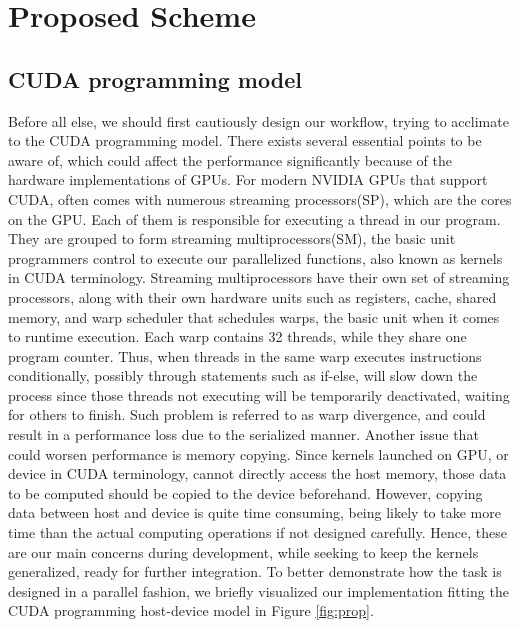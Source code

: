 \documentclass{PHlab-thesis}
\begin{document}
\section{Proposed Scheme}
\subsection{CUDA programming model}
Before all else, we should first cautiously design our workflow, trying to acclimate to the CUDA programming model. There exists several essential points to be aware of, which could affect the performance significantly because of the hardware implementations of GPUs. For modern NVIDIA GPUs that support CUDA, often comes with numerous streaming processors(SP), which are the cores on the GPU. Each of them is responsible for executing a thread in our program. They are grouped to form streaming multiprocessors(SM), the basic unit programmers control to execute our parallelized functions, also known as kernels in CUDA terminology. Streaming multiprocessors have their own set of streaming processors, along with their own hardware units such as registers, cache, shared memory, and warp scheduler that schedules warps, the basic unit when it comes to runtime execution. Each warp contains 32 threads, while they share one program counter. Thus, when threads in the same warp executes instructions conditionally, possibly through statements such as if-else, will slow down the process since those threads not executing will be temporarily deactivated, waiting for others to finish. Such problem is referred to as warp divergence, and could result in a performance loss due to the serialized manner. Another issue that could worsen performance is memory copying. Since kernels launched on GPU, or device in CUDA terminology, cannot directly access the host memory, those data to be computed should be copied to the device beforehand. However, copying data between host and device is quite time consuming, being likely to take more time than the actual computing operations if not designed carefully. Hence, these are our main concerns during development, while seeking to keep the kernels generalized, ready for further integration. To better demonstrate how the task is designed in a parallel fashion, we briefly visualized our implementation fitting the CUDA programming host-device model in Figure \ref{fig:prop}. 
\end{document}
